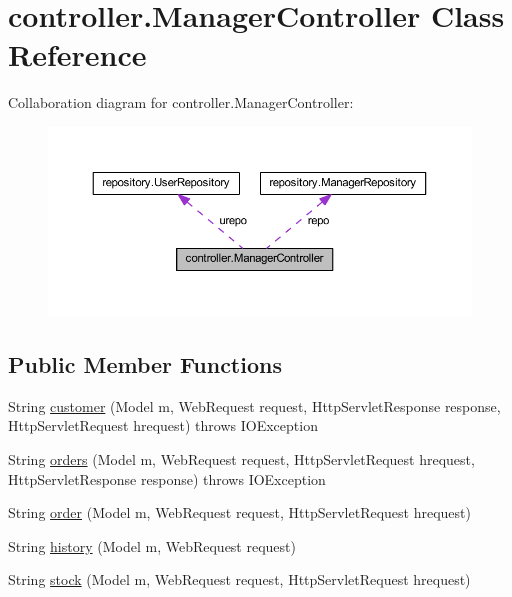 \hypertarget{classcontroller_1_1_manager_controller}{}\section{controller.\+Manager\+Controller Class Reference}
\label{classcontroller_1_1_manager_controller}


Collaboration diagram for controller.\+Manager\+Controller\+:\nopagebreak
\begin{figure}[H]
\begin{center}
\leavevmode
\includegraphics[width=350pt]{classcontroller_1_1_manager_controller__coll__graph}
\end{center}
\end{figure}
\subsection*{Public Member Functions}
\begin{DoxyCompactItemize}
\item 
String \mbox{\hyperlink{classcontroller_1_1_manager_controller_aa49d493a4fb9aa5f0e99f942b21d3991}{customer}} (Model m, Web\+Request request, Http\+Servlet\+Response response, Http\+Servlet\+Request hrequest)  throws I\+O\+Exception 
\item 
String \mbox{\hyperlink{classcontroller_1_1_manager_controller_a59689dd37c44b3294edc931668e57fb0}{orders}} (Model m, Web\+Request request, Http\+Servlet\+Request hrequest, Http\+Servlet\+Response response)  throws I\+O\+Exception 
\item 
String \mbox{\hyperlink{classcontroller_1_1_manager_controller_a32dde55b16d1fb8e38f0a4f1cc0351be}{order}} (Model m, Web\+Request request, Http\+Servlet\+Request hrequest)
\item 
String \mbox{\hyperlink{classcontroller_1_1_manager_controller_a06fcd2a1ad144e711de97430841a804f}{history}} (Model m, Web\+Request request)
\item 
String \mbox{\hyperlink{classcontroller_1_1_manager_controller_a390147f47b5df4b5f24573f167067d71}{stock}} (Model m, Web\+Request request, Http\+Servlet\+Request hrequest)
\end{DoxyCompactItemize}


